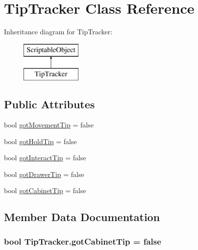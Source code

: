 \hypertarget{class_tip_tracker}{}\section{Tip\+Tracker Class Reference}
\label{class_tip_tracker}
Inheritance diagram for Tip\+Tracker\+:\begin{figure}[H]
\begin{center}
\leavevmode
\includegraphics[height=2.000000cm]{class_tip_tracker}
\end{center}
\end{figure}
\subsection*{Public Attributes}
\begin{DoxyCompactItemize}
\item 
bool \hyperlink{class_tip_tracker_abeb6841d90586f5dda37b7ad322c74dc}{got\+Movement\+Tip} = false
\item 
bool \hyperlink{class_tip_tracker_ac7c6cb050656803b8a24a631a197c04e}{got\+Hold\+Tip} = false
\item 
bool \hyperlink{class_tip_tracker_a74e5351e2cb4af49943d3041a43ab83b}{got\+Interact\+Tip} = false
\item 
bool \hyperlink{class_tip_tracker_afe4d422deeaad8d72b5401d0678ed980}{got\+Drawer\+Tip} = false
\item 
bool \hyperlink{class_tip_tracker_a4e5ad6899dbb79f57e8067a3746c461b}{got\+Cabinet\+Tip} = false
\end{DoxyCompactItemize}


\subsection{Member Data Documentation}
\subsubsection[{\texorpdfstring{got\+Cabinet\+Tip}{gotCabinetTip}}]{\setlength{\rightskip}{0pt plus 5cm}bool Tip\+Tracker.\+got\+Cabinet\+Tip = false}\hypertarget{class_tip_tracker_a4e5ad6899dbb79f57e8067a3746c461b}{}\label{class_tip_tracker_a4e5ad6899dbb79f57e8067a3746c461b}
